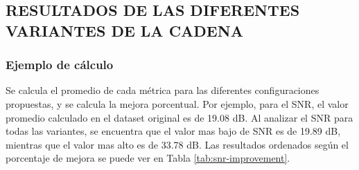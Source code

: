 \subsection{RESULTADOS DE LAS DIFERENTES VARIANTES DE LA CADENA}

\subsubsection{Ejemplo de cálculo}
Se calcula el promedio de cada métrica para las diferentes configuraciones propuestas, y se calcula la mejora porcentual. Por ejemplo, para el SNR, el valor promedio calculado en el dataset original es de 19.08 dB. Al analizar el SNR para todas las variantes, se encuentra que el valor mas bajo de SNR es de 19.89 dB, mientras que el valor mas alto es de 33.78 dB. Las resultados ordenados según el porcentaje de mejora se puede ver en Tabla \ref{tab:snr-improvement}.

